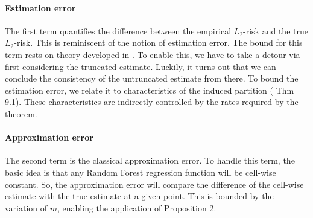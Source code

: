 \documentclass[10pt]{article}
\theoremstyle{definition}
\begin{document}
\paragraph{Estimation error} The first term quantifies the difference between
the empirical $L_2$-risk and the true $L_2$-risk. This is reminiscent of the
notion of estimation error. The bound for this term rests on theory developed in
\cite{gyorfi_DistributionFreeTheoryNonparametric_2002}. To enable this, we have
to take a detour via first considering the truncated estimate. Luckily, it turns
out that we can conclude the consistency of the untruncated estimate from there.
To bound the estimation error, we relate it to characteristics of the induced
partition (\cite{gyorfi_DistributionFreeTheoryNonparametric_2002} Thm 9.1).
These characteristics
are indirectly controlled by the rates required by the theorem.


\paragraph{Approximation error} The second term is the classical approximation
error. To handle this term, the basic idea is that any Random Forest regression
function will be cell-wise constant. So, the approximation error will compare
the difference of the cell-wise estimate with the true estimate at a given
point. This is bounded by the variation of $m$, enabling the application of
Proposition 2.





%
%

\end{document}
